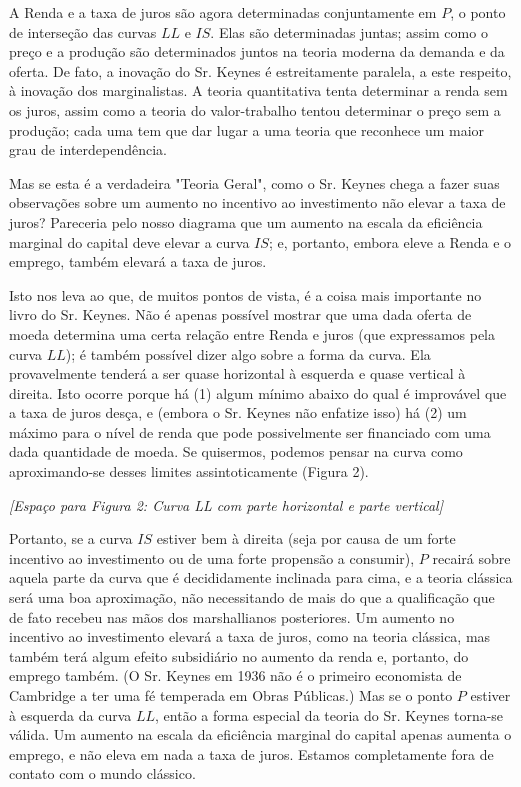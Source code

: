 \documentclass[12pt]{article}
\begin{document}
A Renda e a taxa de juros são agora determinadas conjuntamente em $P$, o ponto de interseção das curvas $LL$ e $IS$. Elas são determinadas juntas; assim como o preço e a produção são determinados juntos na teoria moderna da demanda e da oferta. De fato, a inovação do Sr. Keynes é estreitamente paralela, a este respeito, à inovação dos marginalistas. A teoria quantitativa tenta determinar a renda sem os juros, assim como a teoria do valor-trabalho tentou determinar o preço sem a produção; cada uma tem que dar lugar a uma teoria que reconhece um maior grau de interdependência.

Mas se esta é a verdadeira "Teoria Geral", como o Sr. Keynes chega a fazer suas observações sobre um aumento no incentivo ao investimento não elevar a taxa de juros? Pareceria pelo nosso diagrama que um aumento na escala da eficiência marginal do capital deve elevar a curva $IS$; e, portanto, embora eleve a Renda e o emprego, também elevará a taxa de juros.

Isto nos leva ao que, de muitos pontos de vista, é a coisa mais importante no livro do Sr. Keynes. Não é apenas possível mostrar que uma dada oferta de moeda determina uma certa relação entre Renda e juros (que expressamos pela curva $LL$); é também possível dizer algo sobre a forma da curva. Ela provavelmente tenderá a ser quase horizontal à esquerda e quase vertical à direita. Isto ocorre porque há (1) algum mínimo abaixo do qual é improvável que a taxa de juros desça, e (embora o Sr. Keynes não enfatize isso) há (2) um máximo para o nível de renda que pode possivelmente ser financiado com uma dada quantidade de moeda. Se quisermos, podemos pensar na curva como aproximando-se desses limites assintoticamente (Figura 2).

\begin{center}
\textit{[Espaço para Figura 2: Curva LL com parte horizontal e parte vertical]}
\end{center}

Portanto, se a curva $IS$ estiver bem à direita (seja por causa de um forte incentivo ao investimento ou de uma forte propensão a consumir), $P$ recairá sobre aquela parte da curva que é decididamente inclinada para cima, e a teoria clássica será uma boa aproximação, não necessitando de mais do que a qualificação que de fato recebeu nas mãos dos marshallianos posteriores. Um aumento no incentivo ao investimento elevará a taxa de juros, como na teoria clássica, mas também terá algum efeito subsidiário no aumento da renda e, portanto, do emprego também. (O Sr. Keynes em 1936 não é o primeiro economista de Cambridge a ter uma fé temperada em Obras Públicas.) Mas se o ponto $P$ estiver à esquerda da curva $LL$, então a forma especial da teoria do Sr. Keynes torna-se válida. Um aumento na escala da eficiência marginal do capital apenas aumenta o emprego, e não eleva em nada a taxa de juros. Estamos completamente fora de contato com o mundo clássico.
\end{document}
